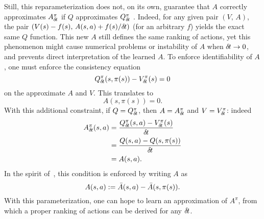 Still, this reparameterization does not, on its own, guarantee that $A$
correctly approximates $A^\pi_{\delta\hspace{-.1em}t}$ if
$Q$ approximates $Q^\pi_{\delta\hspace{-.1em}t}$%
.
Indeed, for any given pair $(V,\,A)$, the pair $(V(s) -
f(s),\,A(s,a)+f(s)/{\delta\hspace{-.1em}t})$ (for an arbitrary $f$)
yields the exact same $Q$ function. This new $A$ still defines %
the same ranking of actions, yet this phenomenon might cause
numerical problems or instability of $A$ when ${\delta\hspace{-.1em}t}\to 0$, and prevents direct
interpretation of the learned $A$.
To enforce identifiability of $A$, one must enforce the consistency equation
\begin{equation}
	Q^\pi_{\delta\hspace{-.1em}t}(s, \pi(s)) - V^\pi_{\delta\hspace{-.1em}t}(s) = 0
\end{equation}
on the approximate $A$ and $V$. This translates to
\begin{equation}
	A(s, \pi(s)) = 0.
\end{equation}
With this additional constraint, if $Q = Q^\pi_{\delta\hspace{-.1em}t}$, then $A =
A^\pi_{\delta\hspace{-.1em}t}$ and $V = V^\pi_{\delta\hspace{-.1em}t}$: indeed 
\begin{align}
	A^\pi_{\delta\hspace{-.1em}t}(s, a) &= \frac{Q^\pi_{\delta\hspace{-.1em}t}(s,a) - V^\pi_{\delta\hspace{-.1em}t}(s)}{{\delta\hspace{-.1em}t}}\\
		    &= \frac{Q(s,a) - Q(s, \pi(s))}{{\delta\hspace{-.1em}t}}\\
		    &= A(s, a).
\end{align}
In the spirit of~\cite{dueling_nets}, this condition is enforced by writing $A$ as
\begin{equation}
\label{eq:Aparam}
	A(s, a) \mathrel{\mathop{:}}= \bar{A}(s, a) - \bar{A}(s, \pi(s)).
\end{equation}
With this parameterization, one can hope to learn an approximation of $A^\pi$,
from which a proper ranking of actions can be derived for any ${\delta\hspace{-.1em}t}$.

